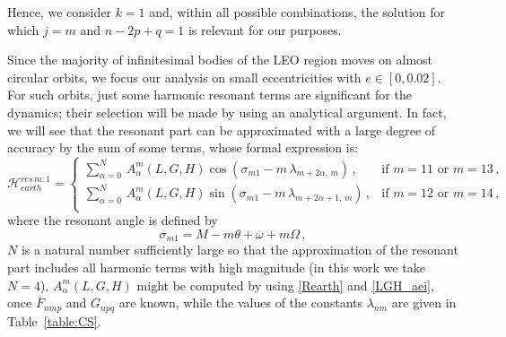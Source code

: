 \documentclass[12pt,reqno]{amsart}
\numberwithin{equation}{section}
\begin{document}
Hence, we consider $k=1$ and, within all possible combinations, the solution for which $j=m$ and $n-2p+q=1$
is relevant for our purposes.

Since  the majority of infinitesimal bodies of the LEO region moves on almost circular orbits,
we focus our analysis on small eccentricities with $e\in [0,0.02]$.
For such orbits, just some harmonic resonant terms are significant for the dynamics;
their selection will be made by using an analytical argument.
In fact, we will see that the resonant part can be approximated with a large degree of accuracy
by the sum of some terms, whose formal expression is:
\begin{equation} \label{Resonant_part}
\mathcal{H}_{earth}^{res\,m:1}=  \left\{
\begin{array}{lc}
  \sum_{\alpha=0}^N \, A^m_\alpha(L,G,H) \cos(\sigma_{m 1} -m\, \lambda_{m+2\alpha, \, m})\,,& \textrm{if } m=11 \textrm{ or } m=13\,, \\
  \sum_{\alpha=0}^N \, A^m_\alpha(L,G,H) \sin(\sigma_{m 1} -m \,\lambda_{m+2\alpha+1, \, m})\,, & \textrm{if } m=12 \textrm{ or } m=14\,, \\
 \end{array}%
\right .
\end{equation}
where the resonant angle is defined by
\begin{equation}\label{sigma_angle}
\sigma_{m 1}=M-m \theta+ \omega +m \Omega\,,
\end{equation}
$N$ is a natural number sufficiently  large so that the approximation of the resonant part includes
all harmonic terms with high magnitude (in this work we take $N=4$), $A^m_\alpha(L,G,H)$
might be computed by using \eqref{Rearth} and \eqref{LGH_aei}, once $\overline{F}_{nmp}$ and $G_{npq}$ are known, while the values of the constants $\lambda_{nm}$ are given in Table~\ref{table:CS}.
\end{document}
